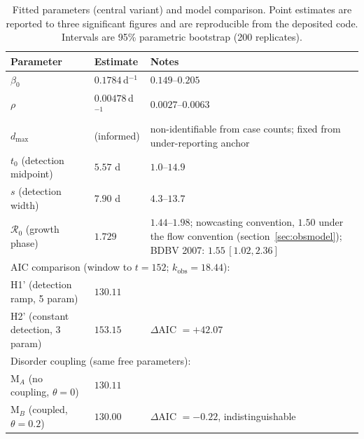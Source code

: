 \documentclass[10pt]{plos}
\newcommand{\Reff}{\mathcal{R}}
\begin{document}
\begin{table}[htbp]
\centering\footnotesize
\caption{Fitted parameters (central variant) and model comparison.
Point estimates are reported to three significant figures and are
reproducible from the deposited code. Intervals are 95\% parametric
bootstrap (200 replicates).}
\label{tab:calib}
\begin{tabularx}{\textwidth}{l>{\raggedright\arraybackslash}p{}>{\raggedright\arraybackslash}X}
\toprule
Parameter & Estimate & Notes \\
\midrule
$\beta_0$ & $0.1784\,$d$^{-1}$ & $0.149$--$0.205$ \\
$\rho$ & $0.00478\,$d$^{-1}$ & $0.0027$--$0.0063$ \\
$d_{\max}$ & 0.75 (informed) & non-identifiable from case counts; fixed from under-reporting anchor \\
$t_0$ (detection midpoint) & $5.57$ d & $1.0$--$14.9$ \\
$s$ (detection width) & $7.90$ d & $4.3$--$13.7$ \\
$\Reff_0$ (growth phase) & $1.729$ & $1.44$--$1.98$; nowcasting convention, $1.50$ under the flow convention (section~\ref{sec:obsmodel}); BDBV 2007: $1.55\,[1.02,2.36]$ \cite{DePadua2026} \\
\midrule
\multicolumn{3}{l}{AIC comparison (window to $t=152$; $k_{\mathrm{obs}}=18.44$):}\\
H1' (detection ramp, 5 param) & $130.11$ & \\
H2' (constant detection, 3 param) & $153.15$ & $\Delta$AIC $=+42.07$ \\
\multicolumn{3}{l}{Disorder coupling (same free parameters):}\\
M$_A$ (no coupling, $\theta=0$) & $130.11$ & \\
M$_B$ (coupled, $\theta=0.2$) & $130.00$ & $\Delta$AIC $=-0.22$, indistinguishable \\
\bottomrule
\end{tabularx}
\end{table}
\end{document}
